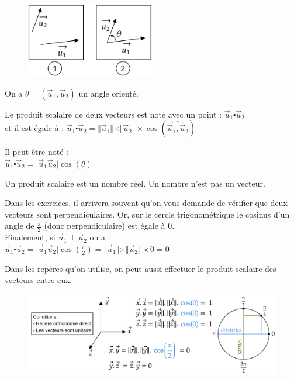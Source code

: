 \documentclass[
	11pt, %
	fleqn, %
	a4paper, %
]{LegrandOrangeBook}
\begin{document}
\begin{figure}[H] %
	\centering %
	\includegraphics[width=0.5\textwidth]{Images/sca1.png} %
\end{figure}
On a $\theta = (\Vec{u}_1, \Vec{u}_2)$ un angle orienté.
\begin{definition}
    Le produit scalaire de deux vecteurs est noté avec un point : $\Vec{u}_1 \centerdot \Vec{u}_2$ \\
    et il est égale à : $\Vec{u}_1 \centerdot \Vec{u}_2 = \Vert \Vec{u}_1 \Vert \times \Vert \Vec{u}_2 \Vert \times \cos ( \widehat{\Vec{u}_1, \Vec{u}_2 } )$
    
\end{definition}

Il peut être noté : \\
$\Vec{u}_1 \centerdot \Vec{u}_2 = \vert \Vec{u}_1 \Vec{u}_2 \vert \cos(\theta)$

Un produit scalaire est un nombre réel. Un nombre n'est pas un vecteur.

\begin{theorem}
    Dans les exercices, il arrivera souvent qu'on vous demande de vérifier que deux vecteurs sont perpendiculaires. Or, sur le cercle trigonométrique le cosinus d'un angle de $\frac{\pi}{2}$ (donc perpendiculaire) est égale à 0. \\
    Finalement, si $\Vec{u}_1 \perp \Vec{u}_2$ on a : \\
    $\Vec{u}_1 \centerdot \Vec{u}_2= \vert \Vec{u}_1 \Vec{u}_2 \vert \cos(\frac{\pi}{2}) = \Vert \Vec{u}_1 \Vert \times \Vert \Vec{u}_2 \Vert \times 0 = 0 $
\end{theorem}

Dans les repères qu'on utilise, on peut aussi effectuer le produit scalaire des vecteurs entre eux.

\begin{figure}[H] %
	\centering %
	\includegraphics[width=1\textwidth]{Images/sca2.png} %
\end{figure}
\end{document}
